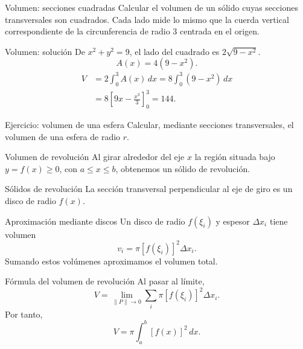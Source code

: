 \documentclass[main.tex]{subfiles}
\begin{document}
\begin{frame}{Volumen: secciones cuadradas}
Calcular el volumen de un sólido cuyas secciones transversales son cuadrados. Cada lado mide lo mismo que la cuerda vertical correspondiente de la circunferencia de radio $3$ centrada en el origen.
\end{frame}

\begin{frame}{Volumen: solución}
\small De $x^2+y^2=9$, el lado del cuadrado es $2\sqrt{9-x^2}$.\[A(x)=4(9-x^2).\]\begin{align*}V&=2\int_0^3A(x)\,dx=8\int_0^3(9-x^2)\,dx\\&=8\left[9x-\frac{x^3}{3}\right]_0^3=\boxed{144}.\end{align*}
\end{frame}

\begin{frame}{Ejercicio: volumen de una esfera}
Calcular, mediante secciones transversales, el volumen de una esfera de radio $r$.
\end{frame}

\begin{frame}{Volumen de revolución}
Al girar alrededor del eje $x$ la región situada bajo $y=f(x)\ge0$, con $a\le x\le b$, obtenemos un sólido de revolución.
\end{frame}

\begin{frame}{Sólidos de revolución}
La sección transversal perpendicular al eje de giro es un disco de radio $f(x)$.
\end{frame}

\begin{frame}{Aproximación mediante discos}
\small Un disco de radio $f(\xi_i)$ y espesor $\Delta x_i$ tiene volumen\[v_i=\pi[f(\xi_i)]^2\Delta x_i.\]Sumando estos volúmenes aproximamos el volumen total.
\end{frame}

\begin{frame}{Fórmula del volumen de revolución}
Al pasar al límite,\[V=\lim_{\|P\|\to0}\sum_i\pi[f(\xi_i)]^2\Delta x_i.\]Por tanto,\[\boxed{V=\pi\int_a^b[f(x)]^2\,dx.}\]
\end{frame}
\end{document}
